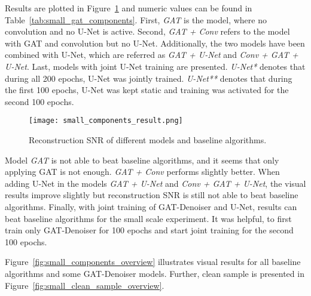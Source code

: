 Results are plotted in Figure~\ref{fig:small_components} and numeric values can be found in Table~\ref{tab:small_gat_components}.
First, \textit{GAT} is the model, where no convolution and no U-Net is active. 
Second, \textit{GAT + Conv} refers to the model with GAT and convolution but no U-Net.
Additionally, the two models have been combined with U-Net, which are referred as 
\textit{GAT + U-Net} and \textit{Conv + GAT + U-Net}.
Last, models with joint U-Net training are presented.
\textit{U-Net*} denotes that during all 200 epochs, U-Net was jointly trained.
\textit{U-Net**} denotes that during the first 100 epochs, U-Net was kept static 
and training was activated for the second 100 epochs.


\begin{figure}[H]
  \centering
  
  \texttt{[image: small\_components\_result.png]}
  \caption{Reconstruction SNR of different models and baseline algorithms.}
  \label{fig:small_components}
\end{figure}

Model \textit{GAT} is not able to beat baseline algorithms, and it seems that only applying GAT is not enough.
\textit{GAT + Conv} performs slightly better. When adding U-Net in the models \textit{GAT + U-Net}  and \textit{Conv + GAT + U-Net},
the visual results improve slightly but reconstruction SNR is still not able to beat baseline algorithms.
Finally, with joint training of GAT-Denoiser and U-Net, 
results can beat baseline algorithms for the small scale experiment. It was helpful, to first train only GAT-Denoiser for 100 epochs 
and start joint training for the second 100 epochs.

Figure~\ref{fig:small_components_overview} illustrates visual results for all baseline algorithms and some GAT-Denoiser models.
Further, clean sample is presented in Figure~\ref{fig:small_clean_sample_overview}.

